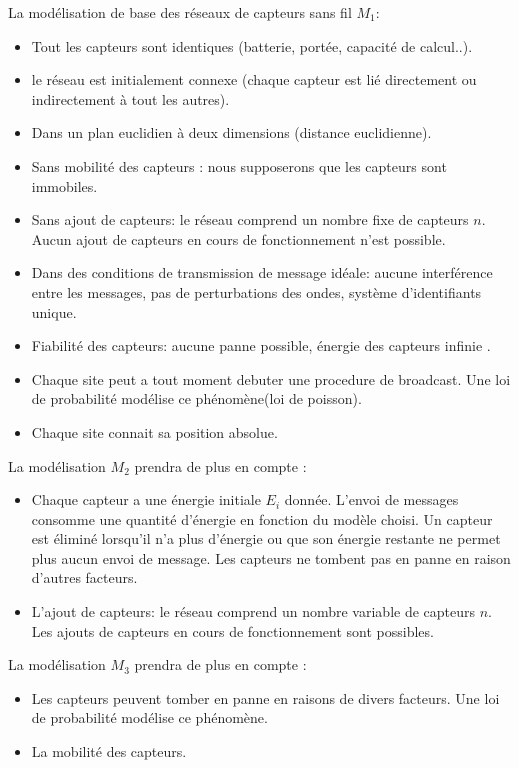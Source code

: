 La modélisation de base des réseaux de capteurs sans fil \textbf{$M_1$}:
\begin{itemize}
 \item Tout les capteurs sont identiques (batterie, portée, capacité de calcul..).
 \item le réseau est initialement connexe (chaque capteur est lié directement ou indirectement à tout les autres).
 \item Dans un plan euclidien à deux dimensions (distance euclidienne).
 \item Sans mobilité des capteurs : nous supposerons que les capteurs sont immobiles.
 \item Sans ajout de capteurs: le réseau comprend un nombre fixe de capteurs $n$. Aucun ajout de capteurs en cours de fonctionnement n'est possible.
 \item Dans des conditions de transmission de message idéale: aucune interférence entre les messages, pas de perturbations des ondes, système d'identifiants unique.
 \item Fiabilité des capteurs: aucune panne possible, énergie des capteurs infinie .
 \item Chaque site peut a tout moment debuter une procedure de broadcast. Une loi de probabilité modélise ce phénomène(loi de poisson).
 \item Chaque site connait sa position absolue.  \\
\end{itemize}

  La modélisation \textbf{$M_2$} prendra de plus en compte :
  
\begin{itemize}
 \item Chaque capteur a une énergie initiale $E_i$ donnée. L'envoi de messages consomme une quantité d'énergie en fonction du modèle choisi. Un capteur est éliminé lorsqu'il n'a plus d'énergie ou que son énergie restante ne permet plus aucun envoi de message. Les capteurs ne tombent pas en panne en raison d'autres facteurs.   
 \item L'ajout de capteurs: le réseau comprend un nombre variable de capteurs $n$. Les ajouts de capteurs en cours de fonctionnement sont possibles.\\
 
\end{itemize}

La modélisation \textbf{$M_3$} prendra de plus en compte :

\begin{itemize}
 \item Les capteurs peuvent tomber en panne en raisons de divers facteurs. Une loi de probabilité modélise ce phénomène.   
 \item La mobilité des capteurs.\\
 
\end{itemize}


